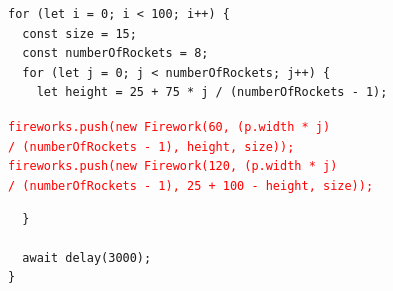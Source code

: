 \documentclass{article}
\begin{document}
    \begin{tcolorbox}[colback=gray!30, colframe=white]
        \begin{verbatim}
for (let i = 0; i < 100; i++) {
  const size = 15;
  const numberOfRockets = 8;
  for (let j = 0; j < numberOfRockets; j++) {
    let height = 25 + 75 * j / (numberOfRockets - 1); \end{verbatim}
        \vspace{-0.4cm}
        \hspace{0.7cm}
        \texttt{\textcolor{red}{fireworks.push(new Firework(60, (p.width * j)}} \\
        \hspace{1.5cm}
        \texttt{\textcolor{red}{/ (numberOfRockets - 1), height, size));}} \\
        \hspace{0.7cm}
        \texttt{\textcolor{red}{fireworks.push(new Firework(120, (p.width * j)}} \\
        \hspace{1.5cm}
        \texttt{\textcolor{red}{/ (numberOfRockets - 1), 25 + 100 - height, size));}} \\
        \vspace{-0.4cm}
        \begin{verbatim}
  }

  await delay(3000);
}\end{verbatim}
    \end{tcolorbox}

    \vspace{0.5cm}
    \vspace{0.5cm}

\end{document}
